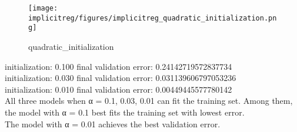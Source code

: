 
\begin{answer}
\begin{figure}[H]
  \centering
  \texttt{[image: implicitreg/figures/implicitreg\_quadratic\_initialization.png]}
  \caption{quadratic_initialization}
\end{figure}
initialization: 0.100 final validation error:  0.24142719572837734\\
initialization: 0.030 final validation error:  0.031139606797053236\\
initialization: 0.010 final validation error:  0.00449445577780142\\
All three models when α = 0.1, 0.03, 0.01 can fit the training set. Among them, the model with α = 0.1 best fits the training set with lowest error.\\
The model with α = 0.01 achieves the best validation error.
\end{answer}